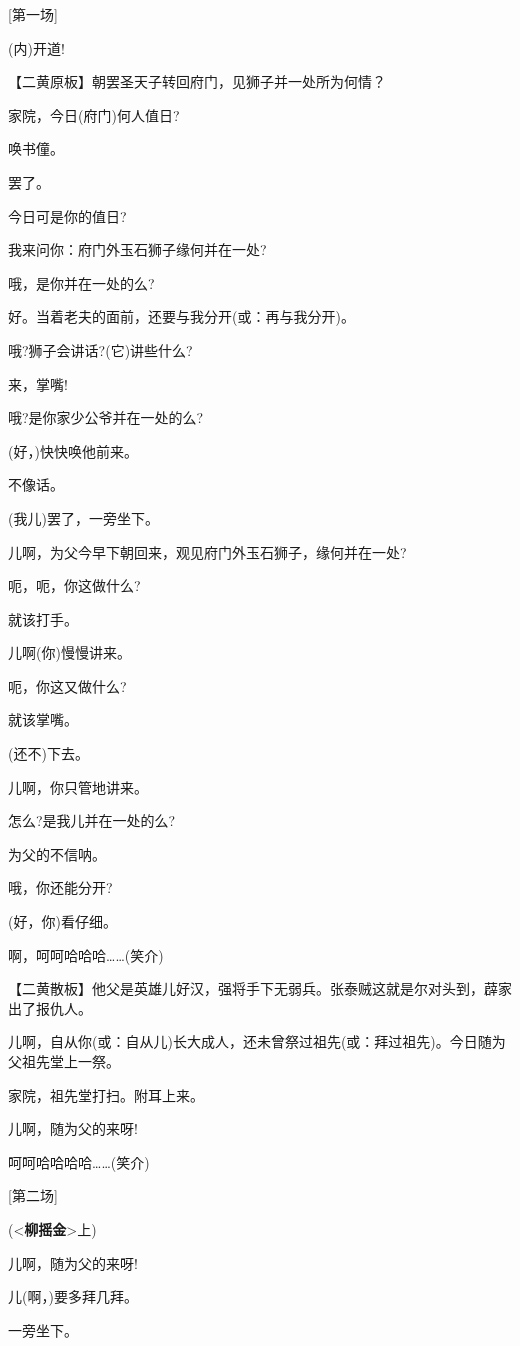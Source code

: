 {[}第一场{]}

(内)开道!

【二黄原板】朝罢圣天子转回府门，见狮子并一处所为何情？

家院，今日(府门)何人值日?

唤书僮。

罢了。

今日可是你的值日?

我来问你：府门外玉石狮子缘何并在一处?

哦，是你并在一处的么?

好。当着老夫的面前，还要与我分开(或：再与我分开)。

哦?狮子会讲话?(它)讲些什么?

来，掌嘴!

哦?是你家少公爷并在一处的么?

(好，)快快唤他前来。

不像话。

(我儿)罢了，一旁坐下。

儿啊，为父今早下朝回来，观见府门外玉石狮子，缘何并在一处?

呃，呃，你这做什么?

就该打手。

儿啊(你)慢慢讲来。

呃，你这又做什么?

就该掌嘴。

(还不)下去。

儿啊，你只管地讲来。

怎么?是我儿并在一处的么?

为父的不信呐。

哦，你还能分开?

(好，你)看仔细。

啊，呵呵哈哈哈\ldots{}\ldots{}(笑介)

【二黄散板】他父是英雄儿好汉，强将手下无弱兵。张泰贼这就是尔对头到，薜家出了报仇人。

儿啊，自从你(或：自从儿)长大成人，还未曾祭过祖先(或：拜过祖先)。今日随为父祖先堂上一祭。

家院，祖先堂打扫。附耳上来。

儿啊，随为父的来呀!

呵呵哈哈哈哈\ldots{}\ldots{}(笑介)

{[}第二场{]}

(\textless{}\textbf{柳摇金}\textgreater{}上)

儿啊，随为父的来呀!

儿(啊，)要多拜几拜。

一旁坐下。

